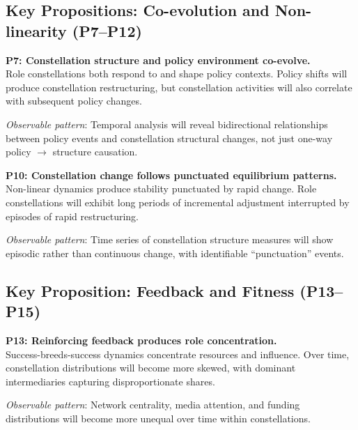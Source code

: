 \documentclass[../main.tex]{subfiles}
\begin{document}
\subsection{Key Propositions: Co-evolution and Non-linearity (P7--P12)}

\begin{propositionbox}
\textbf{P7: Constellation structure and policy environment co-evolve.} \parencite{geels2002technological, garud2003bricolage}\\[3pt]
Role constellations both respond to and shape policy contexts. Policy shifts will produce constellation restructuring, but constellation activities will also correlate with subsequent policy changes.

\vspace{4pt}
\textit{Observable pattern}: Temporal analysis will reveal bidirectional relationships between policy events and constellation structural changes, not just one-way policy $\rightarrow$ structure causation.
\end{propositionbox}

\begin{propositionbox}
\textbf{P10: Constellation change follows punctuated equilibrium patterns.} \parencite{gersick1991revolutionary, romanelli1994organizational}\\[3pt]
Non-linear dynamics produce stability punctuated by rapid change. Role constellations will exhibit long periods of incremental adjustment interrupted by episodes of rapid restructuring.

\vspace{4pt}
\textit{Observable pattern}: Time series of constellation structure measures will show episodic rather than continuous change, with identifiable ``punctuation'' events.
\end{propositionbox}

\subsection{Key Proposition: Feedback and Fitness (P13--P15)}

\begin{propositionbox}
\textbf{P13: Reinforcing feedback produces role concentration.} \parencite{merton1968matthew, simon1955class}\\[3pt]
Success-breeds-success dynamics concentrate resources and influence. Over time, constellation distributions will become more skewed, with dominant intermediaries capturing disproportionate shares.

\vspace{4pt}
\textit{Observable pattern}: Network centrality, media attention, and funding distributions will become more unequal over time within constellations.
\end{propositionbox}
\end{document}
